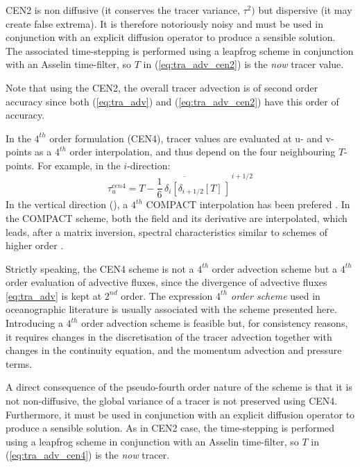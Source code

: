 \documentclass[../main/NEMO_manual]{subfiles}
\begin{document}
CEN2 is non diffusive (\ie it conserves the tracer variance, $\tau^2)$ but dispersive
(\ie it may create false extrema).
It is therefore notoriously noisy and must be used in conjunction with an explicit diffusion operator to
produce a sensible solution.
The associated time-stepping is performed using a leapfrog scheme in conjunction with an Asselin time-filter,
so $T$ in (\autoref{eq:tra_adv_cen2}) is the \textit{now} tracer value. 

Note that using the CEN2, the overall tracer advection is of second order accuracy since
both (\autoref{eq:tra_adv}) and (\autoref{eq:tra_adv_cen2}) have this order of accuracy.


In the $4^{th}$ order formulation (CEN4), tracer values are evaluated at u- and v-points as
a $4^{th}$ order interpolation, and thus depend on the four neighbouring $T$-points.
For example, in the $i$-direction:
\begin{equation}
  \label{eq:tra_adv_cen4}
  \tau_u^{cen4} =\overline{   T - \frac{1}{6}\,\delta_i \left[ \delta_{i+1/2}[T] \,\right]   }^{\,i+1/2}
\end{equation}
In the vertical direction (),
a $4^{th}$ COMPACT interpolation has been prefered \citep{Demange_PhD2014}.
In the COMPACT scheme, both the field and its derivative are interpolated, which leads, after a matrix inversion,
spectral characteristics similar to schemes of higher order \citep{Lele_JCP1992}.
 

Strictly speaking, the CEN4 scheme is not a $4^{th}$ order advection scheme but
a $4^{th}$ order evaluation of advective fluxes,
since the divergence of advective fluxes \autoref{eq:tra_adv} is kept at $2^{nd}$ order.
The expression \textit{$4^{th}$ order scheme} used in oceanographic literature is usually associated with
the scheme presented here.
Introducing a  $4^{th}$ order advection scheme is feasible but, for consistency reasons,
it requires changes in the discretisation of the tracer advection together with changes in the continuity equation,
and the momentum advection and pressure terms.

A direct consequence of the pseudo-fourth order nature of the scheme is that it is not non-diffusive,
\ie the global variance of a tracer is not preserved using CEN4.
Furthermore, it must be used in conjunction with an explicit diffusion operator to produce a sensible solution.
As in CEN2 case, the time-stepping is performed using a leapfrog scheme in conjunction with an Asselin time-filter,
so $T$ in (\autoref{eq:tra_adv_cen4}) is the \textit{now} tracer.
\end{document}
